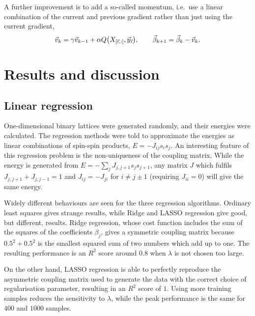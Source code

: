 \documentclass[11pt,british,a4paper]{article}
\numberwithin{equation}{section}
\begin{document}
A further improvement is to add a so-called momentum, i.e.\ use a linear combination of the current and previous gradient rather than just using the current gradient,
\begin{equation}
    \vec{v}_{k} = \gamma \vec{v}_{k-1} + \alpha Q\qty(X_{\qty[\vec{\imath},:]},\vec{y}_{\vec{\imath}}), \qquad
    \vec{\beta}_{k+1} = \vec{\beta}_k - \vec{v}_k.
\end{equation}

\section{Results and discussion}
\subsection{Linear regression}\label{subsec:linregresults}
One-dimensional binary lattices were generated randomly, and their energies were calculated.
The regression methods were told to approximate the energies as linear combinations of spin-spin products, \(E=-J_{ij}s_i s_j\).
An interesting feature of this regression problem is the non-uniqueness of the coupling matrix.
While the energy is generated from \(E=-\sum_j J_{j,j+1}s_j s_{j+1}\), any matrix \(J\) which fulfils \(J_{j,j+1} + J_{j,j-1}=1\) and \(J_{ij} = -J_{ji}\) for \(i\neq j\pm1\) (requiring \(J_{ii}=0\)) will give the same energy.

Widely different behaviours are seen for the three regression algorithms.
Ordinary least squares gives strange results, while Ridge and LASSO regression give good, but different, results.
Ridge regression, whose cost function includes the sum of the squares of the coefficients \(\beta_j\), gives a symmetric coupling matrix because \(\num{0.5}^2+\num{0.5}^2\) is the smallest squared sum of two numbers which add up to one.
The resulting performance is an \(R^2\) score around \(\num{0.8}\) when \(\lambda\) is not chosen too large.

On the other hand, LASSO regression is able to perfectly reproduce the asymmetric coupling matrix used to generate the data with the correct choice of regularisation parameter, resulting in an \(R^2\) score of \(1\). Using more training samples reduces the sensitivity to \(\lambda\), while the peak performance is the same for \(\num{400}\) and \(\num{1000}\) samples.
\end{document}
